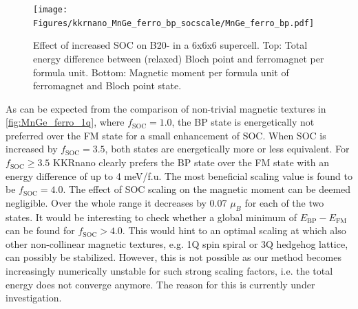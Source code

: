 \documentclass[graybox]{svmult}
\begin{document}
\begin{figure}[htb]
\begin{center}
 \texttt{[image: Figures/kkrnano\_MnGe\_ferro\_bp\_socscale/MnGe\_ferro\_bp.pdf]}
\end{center}
\caption{Effect of increased SOC on B20- in a 6x6x6 supercell.
	Top: Total energy difference between (relaxed) Bloch point and ferromagnet per formula unit.
	Bottom: Magnetic moment per formula unit of ferromagnet and Bloch point state.
	}
\label{fig:MnGe_ferro_bp_socscale}
\end{figure}
As can be expected from the comparison of non-trivial magnetic textures 
in \cref{fig:MnGe_ferro_1q}, where $f_{\text{SOC}}=1.0$, 
the BP state is energetically not preferred over the FM state for a small
enhancement of SOC.
When SOC is increased by $f_{\text{SOC}}=3.5$,
both states are energetically more or less equivalent.
For $f_{\text{SOC}} \geq 3.5$ KKRnano clearly prefers the BP state over the FM state with
an energy difference of up to 4 meV/f.u.
The most beneficial scaling value is found to be $f_{\text{SOC}}=4.0$.
The effect of SOC scaling on the magnetic moment can be deemed negligible. Over the whole
range it decreases by 0.07 $\mu_{B}$ for each of the two states.
It would be interesting to check whether a global minimum of $E_{\text{BP}}-E_{\text{FM}}$ can
be found for $f_{\text{SOC}} > 4.0$. This would hint to an optimal
scaling at which also other non-collinear magnetic textures, e.g. 1Q spin spiral or
3Q hedgehog lattice, can possibly be stabilized.
However, this is not possible as our method becomes increasingly numerically unstable for 
such strong scaling factors, i.e. the total energy does not converge anymore.
The reason for this is currently under investigation.
\end{document}
